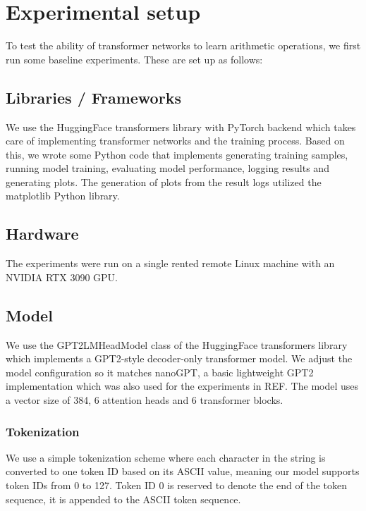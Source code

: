 \section{Experimental setup}

To test the ability of transformer networks to learn arithmetic operations, we first run some baseline experiments. These are set up as follows:

\subsection{Libraries / Frameworks}

We use the HuggingFace transformers library with PyTorch backend which takes care of implementing transformer networks and the training process. Based on this, we wrote some Python code that implements generating training samples, running model training, evaluating model performance, logging results and generating plots. The generation of plots from the result logs utilized the matplotlib Python library.

\subsection{Hardware}

The experiments were run on a single rented remote Linux machine with an NVIDIA RTX 3090 GPU.

\subsection{Model}

We use the GPT2LMHeadModel class of the HuggingFace transformers library which implements a GPT2-style decoder-only transformer model.
We adjust the model configuration so it matches nanoGPT, a basic lightweight GPT2 implementation which was also used for the experiments in REF. 
The model uses a vector size of 384, 6 attention heads and 6 transformer blocks.

\subsubsection{Tokenization}

We use a simple tokenization scheme where each character in the string is converted to one token ID based on its ASCII value, meaning our model supports token IDs from 0 to 127. Token ID 0 is reserved to denote the end of the token sequence, it is appended to the ASCII token sequence.

